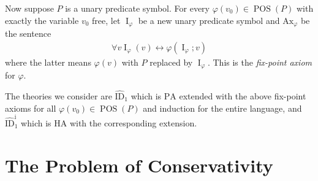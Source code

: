 \documentclass{scrartcl}
\theoremstyle{definition}
\theoremstyle{plain}
\theoremstyle{remark}
\newcommand{\liff}{\leftrightarrow}
\renewcommand{\=}{=\!\!\!=}
\newcommand{\PA}{\ensuremath{\mathrm{PA}}}
\DeclareMathOperator{\I}{I}
\DeclareMathOperator{\POS}{POS}
\newcommand{\ID}[2][]{\ensuremath{\widehat{\mathrm{ID}}_{#2}^{#1}}}
\newcommand{\IID}[1]{\ensuremath{\widehat{\mathrm{ID}}_{#1}^{\mathrm{i}}{}}}
\newcommand{\HA}{\ensuremath{\mathrm{HA}}}
\newcommand{\Ax}{\ensuremath{\mathrm{Ax}}}
\begin{document}
Now suppose $P$ is a unary predicate symbol. For every $\varphi(v_0) \in \POS(P)$ with exactly the variable $v_0$ free, let $\I_{\varphi}$ be a new unary predicate symbol and $\Ax_{\varphi}$ be the sentence
\begin{align}
  \forall v \I_{\varphi}(v) \liff \varphi(\I_{\varphi};v) \label{eq:Iax}\tag{$\dagger$}
\end{align}
where the latter means $\varphi(v)$ with $P$ replaced by $\I_{\varphi}$. This is the \emph{fix-point axiom} for $\varphi$.

The theories we consider are $\ID1$ which is $\PA$ extended with the above fix-point axioms for all $\varphi(v_0) \in \POS(P)$ and induction for the entire language, and $\IID1$ which is $\HA$ with the corresponding extension.

\section{The Problem of Conservativity}
\label{sec:problem}
\end{document}
